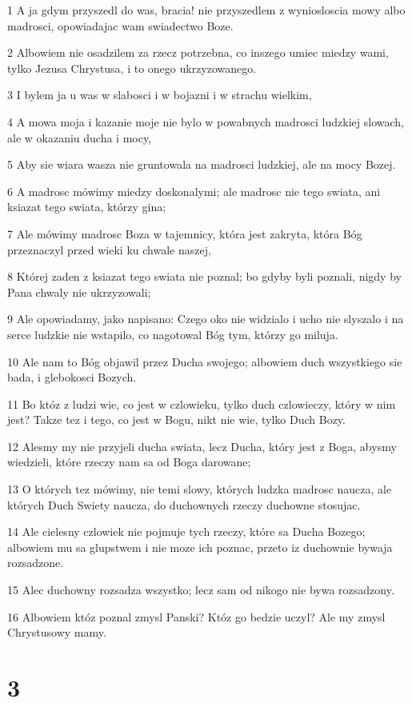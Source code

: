 \par 1 A ja gdym przyszedl do was, bracia! nie przyszedlem z wyniosloscia mowy albo madrosci, opowiadajac wam swiadectwo Boze.
\par 2 Albowiem nie osadzilem za rzecz potrzebna, co inszego umiec miedzy wami, tylko Jezusa Chrystusa, i to onego ukrzyzowanego.
\par 3 I bylem ja u was w slabosci i w bojazni i w strachu wielkim,
\par 4 A mowa moja i kazanie moje nie bylo w powabnych madrosci ludzkiej slowach, ale w okazaniu ducha i mocy,
\par 5 Aby sie wiara wasza nie gruntowala na madrosci ludzkiej, ale na mocy Bozej.
\par 6 A madrosc mówimy miedzy doskonalymi; ale madrosc nie tego swiata, ani ksiazat tego swiata, którzy gina;
\par 7 Ale mówimy madrosc Boza w tajemnicy, która jest zakryta, która Bóg przeznaczyl przed wieki ku chwale naszej,
\par 8 Której zaden z ksiazat tego swiata nie poznal; bo gdyby byli poznali, nigdy by Pana chwaly nie ukrzyzowali;
\par 9 Ale opowiadamy, jako napisano: Czego oko nie widzialo i ucho nie slyszalo i na serce ludzkie nie wstapilo, co nagotowal Bóg tym, którzy go miluja.
\par 10 Ale nam to Bóg objawil przez Ducha swojego; albowiem duch wszystkiego sie bada, i glebokosci Bozych.
\par 11 Bo któz z ludzi wie, co jest w czlowieku, tylko duch czlowieczy, który w nim jest? Takze tez i tego, co jest w Bogu, nikt nie wie, tylko Duch Bozy.
\par 12 Alesmy my nie przyjeli ducha swiata, lecz Ducha, który jest z Boga, abysmy wiedzieli, które rzeczy nam sa od Boga darowane;
\par 13 O których tez mówimy, nie temi slowy, których ludzka madrosc naucza, ale których Duch Swiety naucza, do duchownych rzeczy duchowne stosujac.
\par 14 Ale cielesny czlowiek nie pojmuje tych rzeczy, które sa Ducha Bozego; albowiem mu sa glupstwem i nie moze ich poznac, przeto iz duchownie bywaja rozsadzone.
\par 15 Alec duchowny rozsadza wszystko; lecz sam od nikogo nie bywa rozsadzony.
\par 16 Albowiem któz poznal zmysl Panski? Któz go bedzie uczyl? Ale my zmysl Chrystusowy mamy.

\chapter{3}

